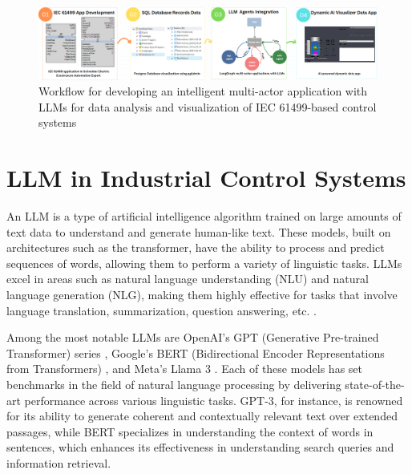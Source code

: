 \documentclass[conference]{IEEEtran}
\begin{document}
\begin{figure}
    \includegraphics[width=1\textwidth]{images/workflow.PNG}
    \caption{Workflow for developing an intelligent multi-actor application with LLMs for data analysis and visualization of IEC 61499-based control systems}
    \label{fig:workflow_diagram}
\end{figure}

\section{LLM in Industrial Control Systems}
\label{sec: LLM in ICS}

An LLM \cite{wang2024survey} is a type of artificial intelligence algorithm trained on large amounts of text data to understand and generate human-like text. These models, built on architectures such as the transformer, have the ability to process and predict sequences of words, allowing them to perform a variety of linguistic tasks. LLMs excel in areas such as natural language understanding (NLU) and natural language generation (NLG), making them highly effective for tasks that involve language translation, summarization, question answering, etc. \cite{wei2022emergent}. 

Among the most notable LLMs are OpenAI's GPT (Generative Pre-trained Transformer) series \cite{openai2023introducinggpts}, Google's BERT (Bidirectional Encoder Representations from Transformers) \cite{google2018bert}, and Meta's Llama 3 \cite{metallama3}. Each of these models has set benchmarks in the field of natural language processing by delivering state-of-the-art performance across various linguistic tasks. GPT-3, for instance, is renowned for its ability to generate coherent and contextually relevant text over extended passages, while BERT specializes in understanding the context of words in sentences, which enhances its effectiveness in understanding search queries and information retrieval.
\end{document}
